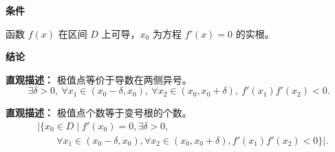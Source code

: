 \begin{statementbox}
	\textbf{\textcolor{CStatement}{条件}}
	\begin{description}[style=nextline, leftmargin=2.8em, labelsep=0.5em, itemsep=0.35em]
		\item[\textbf{\textcolor{CStatement}{条件 1（函数可导）：}}] 函数 $f(x)$ 在区间 $D$ 上可导，$x_0$ 为方程 $f'(x)=0$ 的实根。
	\end{description}

	\textbf{\textcolor{CStatement}{结论}}
	\begin{description}[style=nextline, leftmargin=2.8em, labelsep=0.5em, itemsep=0.45em]
		\item[\textbf{\textcolor{CStatement}{结论一（极值点判定）：}}]
			\textbf{\textcolor{CStatement}{直观描述：}}
			极值点等价于导数在两侧异号。
			\[
				\exists\delta>0,\ \forall x_1\in (x_0-\delta,x_0),\ \forall x_2\in (x_0,x_0+\delta),\ f'(x_1)f'(x_2)<0.
			\]

		\item[\textbf{\textcolor{CStatement}{推广结论（极值点计数）：}}]
			\textbf{\textcolor{CStatement}{直观描述：}}
			极值点个数等于变号根的个数。
			\[
				\begin{aligned}
					&\bigl|\{x_0\in D\mid f'(x_0)=0,\exists\delta>0,\\
					&\qquad \forall x_1\in (x_0-\delta,x_0),\forall x_2\in (x_0,x_0+\delta), f'(x_1)f'(x_2)<0\}\bigr|.
			\end{aligned}
			\]
	\end{description}
\end{statementbox}
